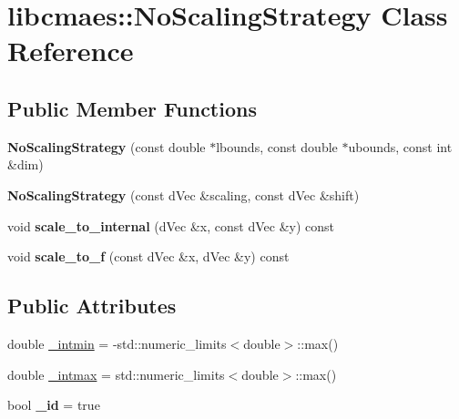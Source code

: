\hypertarget{classlibcmaes_1_1NoScalingStrategy}{\section{libcmaes\-:\-:No\-Scaling\-Strategy Class Reference}
\label{classlibcmaes_1_1NoScalingStrategy}
}
\subsection*{Public Member Functions}
\begin{DoxyCompactItemize}
\item 
\hypertarget{classlibcmaes_1_1NoScalingStrategy_afa32ee30796e0daa71dacf0b39a24038}{{\bfseries No\-Scaling\-Strategy} (const double $\ast$lbounds, const double $\ast$ubounds, const int \&dim)}\label{classlibcmaes_1_1NoScalingStrategy_afa32ee30796e0daa71dacf0b39a24038}

\item 
\hypertarget{classlibcmaes_1_1NoScalingStrategy_acbbef835d75cc1d490e70e3e32be977c}{{\bfseries No\-Scaling\-Strategy} (const d\-Vec \&scaling, const d\-Vec \&shift)}\label{classlibcmaes_1_1NoScalingStrategy_acbbef835d75cc1d490e70e3e32be977c}

\item 
\hypertarget{classlibcmaes_1_1NoScalingStrategy_a2cec97ec77df54410a5218d0fa24913c}{void {\bfseries scale\-\_\-to\-\_\-internal} (d\-Vec \&x, const d\-Vec \&y) const }\label{classlibcmaes_1_1NoScalingStrategy_a2cec97ec77df54410a5218d0fa24913c}

\item 
\hypertarget{classlibcmaes_1_1NoScalingStrategy_ae7c21e6a62a97a9fe4426923440750fc}{void {\bfseries scale\-\_\-to\-\_\-f} (const d\-Vec \&x, d\-Vec \&y) const }\label{classlibcmaes_1_1NoScalingStrategy_ae7c21e6a62a97a9fe4426923440750fc}

\end{DoxyCompactItemize}
\subsection*{Public Attributes}
\begin{DoxyCompactItemize}
\item 
double \hyperlink{classlibcmaes_1_1NoScalingStrategy_a69a76fd22f86dfc2fe25093d0b52b051}{\-\_\-intmin} = -\/std\-::numeric\-\_\-limits$<$double$>$\-::max()
\item 
double \hyperlink{classlibcmaes_1_1NoScalingStrategy_aafe4553f1cd6c78e28b7a5f0992bf9b1}{\-\_\-intmax} = std\-::numeric\-\_\-limits$<$double$>$\-::max()
\item 
\hypertarget{classlibcmaes_1_1NoScalingStrategy_a51ad637db3e8495df119169f32b23701}{bool {\bfseries \-\_\-id} = true}\label{classlibcmaes_1_1NoScalingStrategy_a51ad637db3e8495df119169f32b23701}

\end{DoxyCompactItemize}


